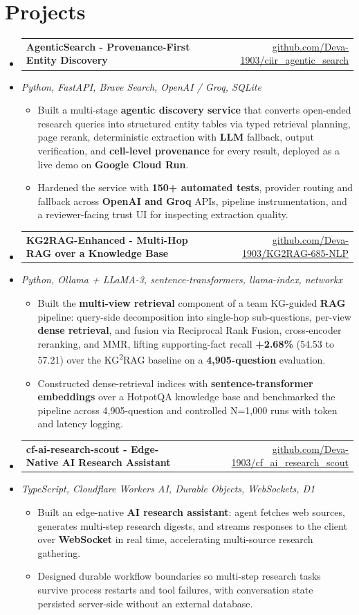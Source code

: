 \documentclass[letterpaper,10pt]{article}
\makeatletter
\newcommand{\resumeItem}[1]{
  \item\small{#1\vspace{-1pt}}
}
\newcommand{\resumeProjectHeading}[2]{
    \item
    \begin{tabular*}{0.985\textwidth}[t]{l@{\extracolsep{\fill}}r}
      \small\textbf{#1} & \small #2 \\
    \end{tabular*}\vspace{-5pt}
}
\newcommand{\resumeProjectSubheading}[1]{
  \vspace{-2pt}\item[] {\small\textcolor{ResumeSlate}{\emph{#1}}}\vspace{-3pt}
}
\newcommand{\resumeSubHeadingListStart}{\begin{itemize}[leftmargin=0.0in, label={}, itemsep=2pt, topsep=2pt]}
\newcommand{\resumeSubHeadingListEnd}{\end{itemize}}
\newcommand{\resumeItemListStart}{\begin{itemize}[leftmargin=0.18in, itemsep=2pt, topsep=1pt]}
\newcommand{\resumeItemListEnd}{\end{itemize}\vspace{-4pt}}
\makeatother
\begin{document}
\section{Projects}
\resumeSubHeadingListStart
  \resumeProjectHeading
    {AgenticSearch - Provenance-First Entity Discovery}
    {\href{https://github.com/Deva-1903/ciir_agentic_search}{github.com/Deva-1903/ciir\_agentic\_search}}
  \resumeProjectSubheading{Python, FastAPI, Brave Search, OpenAI / Groq, SQLite}
    \resumeItemListStart
      \resumeItem{Built a multi-stage \textbf{agentic discovery service} that converts open-ended research queries into structured entity tables via typed retrieval planning, page rerank, deterministic extraction with \textbf{LLM} fallback, output verification, and \textbf{cell-level provenance} for every result, deployed as a live demo on \textbf{Google Cloud Run}.}
      \resumeItem{Hardened the service with \textbf{150+ automated tests}, provider routing and fallback across \textbf{OpenAI and Groq} APIs, pipeline instrumentation, and a reviewer-facing trust UI for inspecting extraction quality.}
    \resumeItemListEnd
  \resumeProjectHeading
    {KG2RAG-Enhanced - Multi-Hop RAG over a Knowledge Base}
    {\href{https://github.com/Deva-1903/KG2RAG-685-NLP}{github.com/Deva-1903/KG2RAG-685-NLP}}
  \resumeProjectSubheading{Python, Ollama + LLaMA-3, sentence-transformers, llama-index, networkx}
    \resumeItemListStart
      \resumeItem{Built the \textbf{multi-view retrieval} component of a team KG-guided \textbf{RAG} pipeline: query-side decomposition into single-hop sub-questions, per-view \textbf{dense retrieval}, and fusion via Reciprocal Rank Fusion, cross-encoder reranking, and MMR, lifting supporting-fact recall \textbf{+2.68\%} (54.53 to 57.21) over the KG\textsuperscript{2}RAG baseline on a \textbf{4,905-question} evaluation.}
      \resumeItem{Constructed dense-retrieval indices with \textbf{sentence-transformer embeddings} over a HotpotQA knowledge base and benchmarked the pipeline across 4,905-question and controlled N=1,000 runs with token and latency logging.}
    \resumeItemListEnd
  \resumeProjectHeading
    {cf-ai-research-scout - Edge-Native AI Research Assistant}
    {\href{https://github.com/Deva-1903/cf_ai_research_scout}{github.com/Deva-1903/cf\_ai\_research\_scout}}
  \resumeProjectSubheading{TypeScript, Cloudflare Workers AI, Durable Objects, WebSockets, D1}
    \resumeItemListStart
      \resumeItem{Built an edge-native \textbf{AI research assistant}: agent fetches web sources, generates multi-step research digests, and streams responses to the client over \textbf{WebSocket} in real time, accelerating multi-source research gathering.}
      \resumeItem{Designed durable workflow boundaries so multi-step research tasks survive process restarts and tool failures, with conversation state persisted server-side without an external database.}
    \resumeItemListEnd
\resumeSubHeadingListEnd
\vspace{-4pt}
\end{document}
